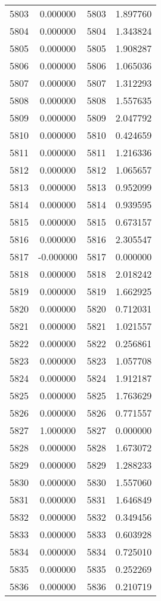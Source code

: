 \documentclass[12pt]{article}
\begin{document}
\begin{longtable}{@{}cccc@{}}
5803 & 0.000000 & 5803 & 1.897760 \\
5804 & 0.000000 & 5804 & 1.343824 \\
5805 & 0.000000 & 5805 & 1.908287 \\
5806 & 0.000000 & 5806 & 1.065036 \\
5807 & 0.000000 & 5807 & 1.312293 \\
5808 & 0.000000 & 5808 & 1.557635 \\
5809 & 0.000000 & 5809 & 2.047792 \\
5810 & 0.000000 & 5810 & 0.424659 \\
5811 & 0.000000 & 5811 & 1.216336 \\
5812 & 0.000000 & 5812 & 1.065657 \\
5813 & 0.000000 & 5813 & 0.952099 \\
5814 & 0.000000 & 5814 & 0.939595 \\
5815 & 0.000000 & 5815 & 0.673157 \\
5816 & 0.000000 & 5816 & 2.305547 \\
5817 & -0.000000 & 5817 & 0.000000 \\
5818 & 0.000000 & 5818 & 2.018242 \\
5819 & 0.000000 & 5819 & 1.662925 \\
5820 & 0.000000 & 5820 & 0.712031 \\
5821 & 0.000000 & 5821 & 1.021557 \\
5822 & 0.000000 & 5822 & 0.256861 \\
5823 & 0.000000 & 5823 & 1.057708 \\
5824 & 0.000000 & 5824 & 1.912187 \\
5825 & 0.000000 & 5825 & 1.763629 \\
5826 & 0.000000 & 5826 & 0.771557 \\
5827 & 1.000000 & 5827 & 0.000000 \\
5828 & 0.000000 & 5828 & 1.673072 \\
5829 & 0.000000 & 5829 & 1.288233 \\
5830 & 0.000000 & 5830 & 1.557060 \\
5831 & 0.000000 & 5831 & 1.646849 \\
5832 & 0.000000 & 5832 & 0.349456 \\
5833 & 0.000000 & 5833 & 0.603928 \\
5834 & 0.000000 & 5834 & 0.725010 \\
5835 & 0.000000 & 5835 & 0.252269 \\
5836 & 0.000000 & 5836 & 0.210719 \\

\end{longtable}
\end{document}
